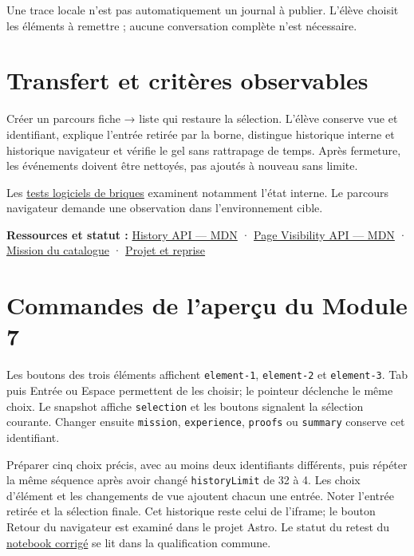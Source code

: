 \documentclass[
  canadien,
  11pt,
  a4paper,
]{report}
\begin{document}
Une trace locale n'est pas automatiquement un journal à publier. L'élève
choisit les éléments à remettre ; aucune conversation complète n'est
nécessaire.

\section{Transfert et critères
observables}\label{transfert-et-crituxe8res-observables-6}

Créer un parcours fiche → liste qui restaure la sélection. L'élève
conserve vue et identifiant, explique l'entrée retirée par la borne,
distingue historique interne et historique navigateur et vérifie le gel
sans rattrapage de temps. Après fermeture, les événements doivent être
nettoyés, pas ajoutés à nouveau sans limite.

Les \href{../../../../../tests/learning-notebooks-bricks.test.ts}{tests
logiciels de briques} examinent notamment l'état interne. Le parcours
navigateur demande une observation dans l'environnement cible.

\textbf{Ressources et statut :}
\href{https://developer.mozilla.org/en-US/docs/Web/API/History_API}{History
API --- MDN} ·
\href{https://developer.mozilla.org/en-US/docs/Web/API/Page_Visibility_API}{Page
Visibility API --- MDN} ·
\href{../../../../../packages/learning/src/catalog.ts}{Mission du
catalogue} · \href{../../PROJECT.md}{Projet et reprise}

\section{Commandes de l'aperçu du Module
7}\label{commandes-de-laperuxe7u-du-module-7}

Les boutons des trois éléments affichent \texttt{element-1},
\texttt{element-2} et \texttt{element-3}. Tab puis Entrée ou Espace
permettent de les choisir; le pointeur déclenche le même choix. Le
snapshot affiche \texttt{selection} et les boutons signalent la
sélection courante. Changer ensuite \texttt{mission},
\texttt{experience}, \texttt{proofs} ou \texttt{summary} conserve cet
identifiant.

Préparer cinq choix précis, avec au moins deux identifiants différents,
puis répéter la même séquence après avoir changé \texttt{history\allowbreak{}Limit}
de 32 à 4. Les choix d'élément et les changements de vue ajoutent chacun
une entrée. Noter l'entrée retirée et la sélection finale. Cet
historique reste celui de l'iframe; le bouton Retour du navigateur est
examiné dans le projet Astro. Le statut du retest du
\href{../../notebooks/module-7.ipynb}{notebook corrigé} se lit dans la
qualification commune.
\end{document}
